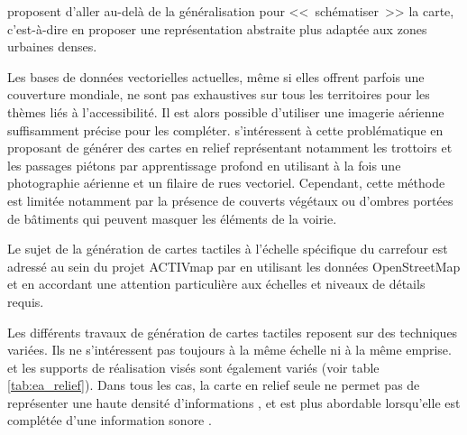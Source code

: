 \newpar{}

\citet{Touya2019} proposent d'aller au-delà de la généralisation pour <<~schématiser~>> la carte, c'est-à-dire en proposer une représentation abstraite plus adaptée aux zones urbaines denses. 

\newpar{}

Les bases de données vectorielles actuelles, même si elles offrent parfois une couverture mondiale, ne sont pas exhaustives sur tous les territoires pour les thèmes liés à l’accessibilité. Il est alors possible d'utiliser une imagerie aérienne suffisamment précise pour les compléter. \citet{FillieresRiveau2020} s'intéressent à cette problématique en proposant de générer des cartes en relief représentant notamment les trottoirs et les passages piétons par apprentissage profond en utilisant à la fois une photographie aérienne et un filaire de rues vectoriel. Cependant, cette méthode est limitée notamment par la présence de couverts végétaux ou d'ombres portées de bâtiments qui peuvent masquer les éléments de la voirie.

\newpar{}

Le sujet de la génération de cartes tactiles à l'échelle spécifique du carrefour est adressé au sein du projet ACTIVmap par \citet{Jiang2023} en utilisant les données OpenStreetMap et en accordant une attention particulière aux échelles et niveaux de détails requis.

\newpar{}

Les différents travaux de génération de cartes tactiles reposent sur des techniques variées. Ils ne s'intéressent pas toujours à la même échelle ni à la même emprise. et les supports de réalisation visés sont également variés (voir table \ref{tab:ea_relief}). Dans tous les cas, la carte en relief seule ne permet pas de représenter une haute densité d'informations \citep{Touya2019}, et est plus abordable lorsqu'elle est complétée d'une information sonore \citep{Brock2015}.

